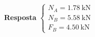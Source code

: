 \textbf{Resposta}
$
\begin{cases}
	N_{A}=\SI{1.78}{\kilo\newton}\\
	N_{B}=\SI{5.58}{\kilo\newton}\\
	F_{B}=\SI{4.50}{\kilo\newton}
\end{cases}
$